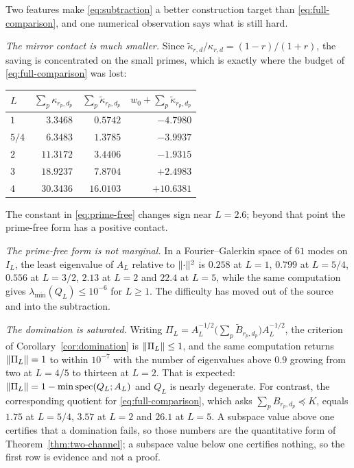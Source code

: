 Two features make \eqref{eq:subtraction} a better construction target than
\eqref{eq:full-comparison}, and one numerical observation says what is still
hard.

\emph{The mirror contact is much smaller.} Since
$\widetilde\kappa_{r,d}/\kappa_{r,d}=(1-r)/(1+r)$, the saving is concentrated
on the small primes, which is exactly where the budget of
\eqref{eq:full-comparison} was lost:
\begin{center}
\small
\begin{tabular}{lrrr}
\toprule
$L$ & $\sum_p\kappa_{r_p,d_p}$ & $\sum_p\widetilde\kappa_{r_p,d_p}$
 & $w_0+\sum_p\widetilde\kappa_{r_p,d_p}$\\
\midrule
$1$ & $3.3468$ & $0.5742$ & $-4.7980$\\
$5/4$ & $6.3483$ & $1.3785$ & $-3.9937$\\
$2$ & $11.3172$ & $3.4406$ & $-1.9315$\\
$3$ & $18.9237$ & $7.8704$ & $+2.4983$\\
$4$ & $30.3436$ & $16.0103$ & $+10.6381$\\
\bottomrule
\end{tabular}
\end{center}
The constant in \eqref{eq:prime-free} changes sign near $L=2.6$; beyond that
point the prime-free form has a positive contact.

\emph{The prime-free form is not marginal.} In a Fourier--Galerkin space of
$61$ modes on $I_L$, the least eigenvalue of $A_L$ relative to
$\lVert \cdot\rVert^2$ is $0.258$ at $L=1$, $0.799$ at $L=5/4$, $0.556$ at $L=3/2$,
$2.13$ at $L=2$ and $22.4$ at $L=5$, while the same computation gives
$\lambda_{\min}(Q_L)\leq10^{-6}$ for $L\geq1$. The difficulty has moved out
of the source and into the subtraction.

\emph{The domination is saturated.} Writing
$\Pi_L=A_L^{-1/2}\big(\sum_p\widetilde B_{r_p,d_p}\big)A_L^{-1/2}$, the
criterion of Corollary~\ref{cor:domination} is $\lVert \Pi_L\rVert\leq1$, and the
same computation returns $\lVert \Pi_L\rVert=1$ to within $10^{-7}$ with the number
of eigenvalues above $0.9$ growing from two at $L=4/5$ to thirteen at $L=2$.
That is expected: $\lVert \Pi_L\rVert=1-\min\operatorname{spec}(Q_L;A_L)$ and $Q_L$
is nearly degenerate. For contrast, the corresponding quotient for
\eqref{eq:full-comparison}, which asks $\sum_pB_{r_p,d_p}\preceq K$, equals
$1.75$ at $L=5/4$, $3.57$ at $L=2$ and $26.1$ at $L=5$. A subspace value
above one certifies that a domination fails, so those numbers are the
quantitative form of Theorem~\ref{thm:two-channel}; a subspace value below
one certifies nothing, so the first row is evidence and not a proof.


